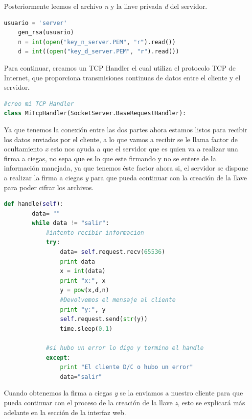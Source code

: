 Posteriormente leemos el archivo \textit{n} y la llave privada \textit{d} del servidor.

	\begin{lstlisting}[language=Python,frame=single, keywordstyle=\color{blue},showstringspaces=false]
	usuario = 'server'
	gen_rsa(usuario)
	n = int(open("key_n_server.PEM", "r").read())
	d = int((open("key_d_server.PEM", "r").read())
	\end{lstlisting}

Para continuar, creamos un TCP Handler el cual utiliza el protocolo TCP de Internet, que proporciona transmisiones continuas de datos entre el cliente y el servidor.

 
\begin{lstlisting}[language=Python,frame=single, keywordstyle=\color{blue},showstringspaces=false]
#creo mi TCP Handler
class MiTcpHandler(SocketServer.BaseRequestHandler):
\end{lstlisting}


Ya que tenemos la conexión entre las dos partes ahora estamos listos para recibir los datos enviados por el cliente, a lo que vamos a recibir se le llama factor de ocultamiento  \textit{x} esto nos ayuda a que el servidor que es quien va a realizar una firma a ciegas, no sepa que es lo que este firmando y no se entere de la información manejada, ya que tenemos éste factor ahora si, el servidor se dispone a realizar la firma a ciegas \textit{y} para que pueda continuar con la creación de la llave para poder cifrar los archivos.

\begin{lstlisting}[language=Python,frame=single, keywordstyle=\color{blue},showstringspaces=false]
       def handle(self):
        data= ""
        while data != "salir":
            #intento recibir informacion
            try:
                data= self.request.recv(65536)
                print data
                x = int(data)
                print "x:", x
                y = pow(x,d,n)
				#Devolvemos el mensaje al cliente
                print "y:", y
                self.request.send(str(y))
                time.sleep(0.1)
			
            #si hubo un error lo digo y termino el handle
            except:
                print "El cliente D/C o hubo un error"
                data="salir"
\end{lstlisting}

Cuando obtenemos la firma a ciegas \textit{y} se la enviamos a nuestro cliente para que pueda continuar con el proceso de la creación de la llave \textit{z}, esto se explicará más adelante en la sección de la interfaz web.



